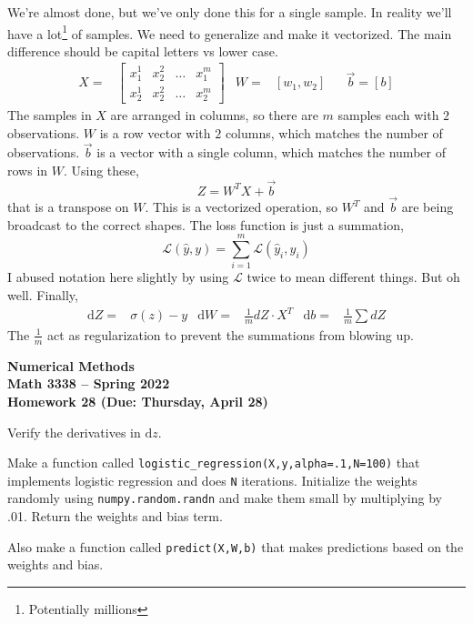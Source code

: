 \documentclass[11pt,letterpaper]{article}
\newcommand{\semester}{Spring 2022}
\newcommand{\due}{Thursday, April 28}
\newcommand{\D}{\text{d}}
\begin{document}
We're almost done, but we've only done this for a single sample. In reality we'll have a lot\footnote{Potentially millions} of samples. We need to generalize and make it vectorized. The main difference should be capital letters vs lower case. 
\begin{align*}
 X = & \begin{bmatrix}
   x^1_1 & x^2_2 & \dots & x^m_1\\
   x^1_2 & x^2_2 & \dots & x^m_2
 \end{bmatrix}
 & W = & [w_1, w_2] & & \vec{b} = [b]
\end{align*}
The samples in $X$ are arranged in columns, so there are $m$ samples each with $2$ observations. $W$ is a row vector with $2$ columns, which matches the number of observations. $\vec{b}$ is a vector with a single column, which matches the number of rows in $W$. Using these, 
\begin{equation*}
 Z = W^TX+\vec{b}
\end{equation*}
that is a transpose on $W$. This is a vectorized operation, so $W^T$ and $\vec{b}$ are being broadcast to the correct shapes. The loss function is just a summation,
\begin{equation*}
 \mathcal{L}(\hat{y},y) = \sum_{i=1}^m \mathcal{L}(\hat{y}_i,y_i)
\end{equation*}
I abused notation here slightly by using $\mathcal{L}$ twice to mean different things. But oh well. Finally,
\begin{align*}
\D Z = & \sigma(z) - y & \D W = & \frac{1}{m}dZ\cdot X^T & \D b = & \frac{1}{m}\sum dZ
\end{align*}
The $\frac{1}{m}$ act as regularization to prevent the summations from blowing up. 



\newpage

\begin{center}
{\huge{\bf  Numerical Methods}} \\[1.5ex]
{\bf Math 3338 -- \semester}\\[1.5ex]
{\Large{\bf Homework 28 (Due: \due)}}\\
\end{center}
\vspace{2mm}

\begin{problem}
 Verify the derivatives in $\D z$. 
\end{problem}



\begin{problem}
 Make a function called \texttt{logistic\_regression(X,y,alpha=.1,N=100)} that implements logistic regression and does \texttt{N} iterations. Initialize the weights randomly using \texttt{numpy.random.randn} and make them small by multiplying by .01. Return the weights and bias term.
 
 Also make a function called \texttt{predict(X,W,b)} that makes predictions based on the weights and bias.
\end{problem}
\end{document}

